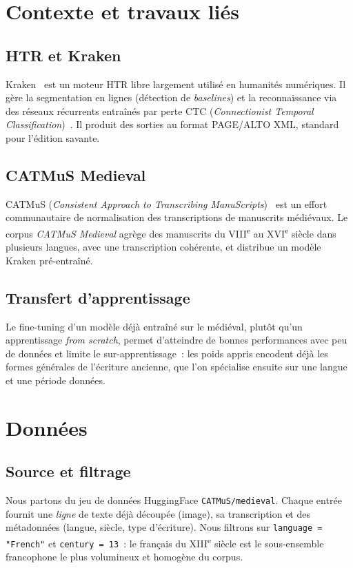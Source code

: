 \documentclass[10pt,journal,a4paper]{IEEEtran}
\begin{document}
\section{Contexte et travaux liés}

\subsection{HTR et Kraken}
Kraken~\cite{kraken} est un moteur HTR libre largement utilisé en humanités
numériques. Il gère la segmentation en lignes (détection de \textit{baselines})
et la reconnaissance via des réseaux récurrents entraînés par perte CTC
(\textit{Connectionist Temporal Classification})~\cite{ctc}. Il produit des
sorties au format PAGE/ALTO XML, standard pour l'édition savante.

\subsection{CATMuS Medieval}
CATMuS (\textit{Consistent Approach to Transcribing ManuScripts})~\cite{catmus}
est un effort communautaire de normalisation des transcriptions de manuscrits
médiévaux. Le corpus \textit{CATMuS Medieval} agrège des manuscrits du
VIII\textsuperscript{e} au XVI\textsuperscript{e} siècle dans plusieurs langues,
avec une transcription cohérente, et distribue un modèle Kraken pré-entraîné.

\subsection{Transfert d'apprentissage}
Le fine-tuning d'un modèle déjà entraîné sur le médiéval, plutôt qu'un
apprentissage \textit{from scratch}, permet d'atteindre de bonnes performances
avec peu de données et limite le sur-apprentissage~: les poids appris encodent
déjà les formes générales de l'écriture ancienne, que l'on spécialise ensuite
sur une langue et une période données.

\section{Données}

\subsection{Source et filtrage}
Nous partons du jeu de données HuggingFace \texttt{CATMuS/medieval}. Chaque
entrée fournit une \emph{ligne} de texte déjà découpée (image), sa transcription
et des métadonnées (langue, siècle, type d'écriture). Nous filtrons sur
\texttt{language = "French"} et \texttt{century = 13}~: le français du
XIII\textsuperscript{e} siècle est le sous-ensemble francophone le plus
volumineux et homogène du corpus.
\end{document}
